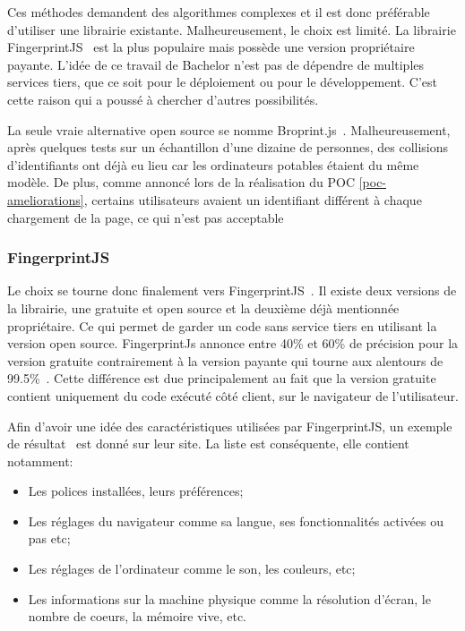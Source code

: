 Ces méthodes demandent des algorithmes complexes et il est donc préférable d'utiliser une librairie existante. Malheureusement, le choix est limité. La librairie FingerprintJS~\cite{fingerprintjs} est la plus populaire mais possède une version propriétaire payante. L'idée de ce travail de Bachelor n'est pas de dépendre de multiples services tiers, que ce soit pour le déploiement ou pour le développement. C'est cette raison qui a poussé à chercher d'autres possibilités.

La seule vraie alternative open source se nomme Broprint.js~\cite{broprintjs}. Malheureusement, après quelques tests sur un échantillon d'une dizaine de personnes, des collisions d'identifiants ont déjà eu lieu car les ordinateurs potables étaient du même modèle. De plus, comme annoncé lors de la réalisation du POC \ref{poc-ameliorations}, certains utilisateurs avaient un identifiant différent à chaque chargement de la page, ce qui n'est pas acceptable

\subsubsection{FingerprintJS}
Le choix se tourne donc finalement vers FingerprintJS~\cite{fingerprintjs}. Il existe deux versions de la librairie, une gratuite et open source et la deuxième déjà mentionnée propriétaire. Ce qui permet de garder un code sans service tiers en utilisant la version open source. FingerprintJs annonce entre 40\% et 60\% de précision pour la version gratuite contrairement à la version payante qui tourne aux alentours de 99.5\%~\cite{fingerprintjsrepo}. Cette différence est due principalement au fait que la version gratuite contient uniquement du code exécuté côté client, sur le navigateur de l'utilisateur.

Afin d'avoir une idée des caractéristiques utilisées par FingerprintJS, un exemple de résultat~\cite{fingerprintjs-example} est donné sur leur site. La liste est conséquente, elle contient notamment:

\begin{itemize}
  \item Les polices installées, leurs préférences;
  \item Les réglages du navigateur comme sa langue, ses fonctionnalités activées ou pas etc;
  \item Les réglages de l'ordinateur comme le son, les couleurs, etc;
  \item Les informations sur la machine physique comme la résolution d'écran, le nombre de coeurs, la mémoire vive, etc.
\end{itemize}

